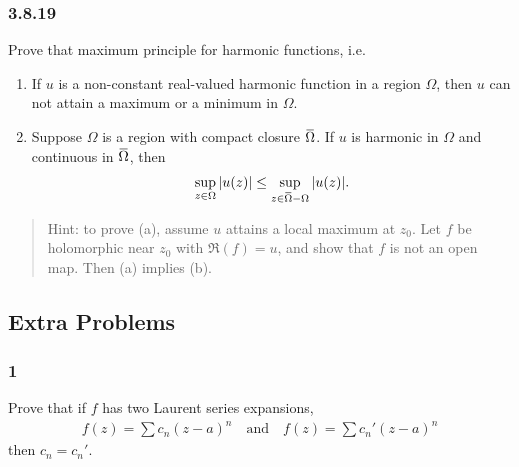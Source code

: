 \hypertarget{section-67}{%
\subsubsection{3.8.19}\label{section-67}}

Prove that maximum principle for harmonic functions, i.e.

\begin{enumerate}
\def\labelenumi{\alph{enumi}.}
\item
  If \(u\) is a non-constant real-valued harmonic function in a region
  \(\Omega\), then \(u\) can not attain a maximum or a minimum in
  \(\Omega\).
\item
  Suppose \(\Omega\) is a region with compact closure
  \(\mkern 1.5mu\overline{\mkern-1.5mu\Omega\mkern-1.5mu}\mkern 1.5mu\).
  If \(u\) is harmonic in \(\Omega\) and continuous in
  \(\mkern 1.5mu\overline{\mkern-1.5mu\Omega\mkern-1.5mu}\mkern 1.5mu\),
  then
  \begin{align*}
   \sup _{z \in \Omega}|u(z)| \leq \sup _{z \in \mkern 1.5mu\overline{\mkern-1.5mu\Omega \mkern-1.5mu}\mkern 1.5mu-\Omega}|u(z)|
   .\end{align*}
\end{enumerate}

\begin{quote}
Hint: to prove (a), assume \(u\) attains a local maximum at \(z_0\). Let
\(f\) be holomorphic near \(z_0\) with \(\Re(f) = u\), and show that
\(f\) is not an open map. Then (a) implies (b).
\end{quote}

\hypertarget{extra-problems}{%
\subsection{Extra Problems}\label{extra-problems}}

\hypertarget{section-68}{%
\subsubsection{1}\label{section-68}}

\begin{description}
\tightlist
\item[Problem]
Prove that if \(f\) has two Laurent series expansions,
\begin{align*}
  f(z) = \sum c_n(z-a)^n \quad\text{and}\quad f(z) = \sum c_n'(z-a)^n
  \end{align*}
then \(c_n = c_n'\).
\end{description}

